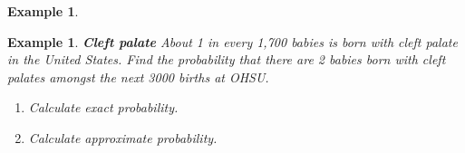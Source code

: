\documentclass[12pt]{amsart}
\newtheorem{example}[theorem]{Example}
\newcommand{\bP}{\mathbb{P}}
\begin{document}
{\begin{example}
\begin{enumerate}
\vfill
\end{enumerate}


\end{example} 
	
\newpage


\begin{example}  \textbf{Cleft palate} \newline
About 1 in every 1,700 babies is born with cleft palate in the United States. Find the probability that there are 2 babies born with cleft palates amongst the next 3000 births at OHSU. 


\begin{enumerate}
\item Calculate exact probability.
%

\vfill


\item Calculate approximate probability.

%
%
%
\vfill

\end{enumerate}


\end{example} 


}  %
\end{document}
